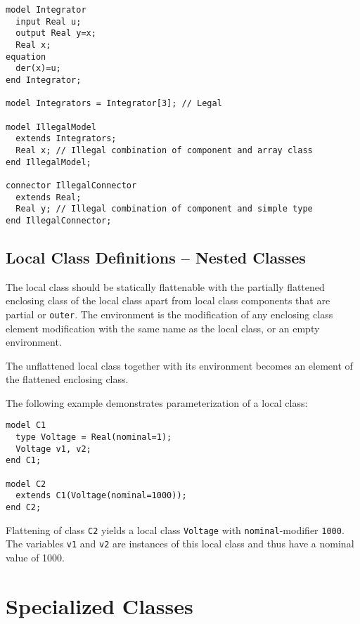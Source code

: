 \begin{example}
\begin{lstlisting}[language=modelica]
model Integrator
  input Real u;
  output Real y=x;
  Real x;
equation
  der(x)=u;
end Integrator;

model Integrators = Integrator[3]; // Legal

model IllegalModel
  extends Integrators;
  Real x; // Illegal combination of component and array class
end IllegalModel;

connector IllegalConnector
  extends Real;
  Real y; // Illegal combination of component and simple type
end IllegalConnector;
\end{lstlisting}
\end{example}

\subsection{Local Class Definitions -- Nested Classes}

The local class should be statically flattenable with the partially
flattened enclosing class of the local class apart from local class
components that are partial or \lstinline!outer!. The environment is the
modification of any enclosing class element modification with the same
name as the local class, or an empty environment.

The unflattened local class together with its environment becomes an
element of the flattened enclosing class.

\begin{example}
The following example demonstrates parameterization of a local class:
\begin{lstlisting}[language=modelica]
model C1
  type Voltage = Real(nominal=1);
  Voltage v1, v2;
end C1;

model C2
  extends C1(Voltage(nominal=1000));
end C2;
\end{lstlisting}

Flattening of class \lstinline!C2! yields a local class \lstinline!Voltage! with
\lstinline!nominal!-modifier \lstinline!1000!. The variables \lstinline!v1! and \lstinline!v2! are
instances of this local class and thus have a nominal value of 1000.
\end{example}

\section{Specialized Classes}

